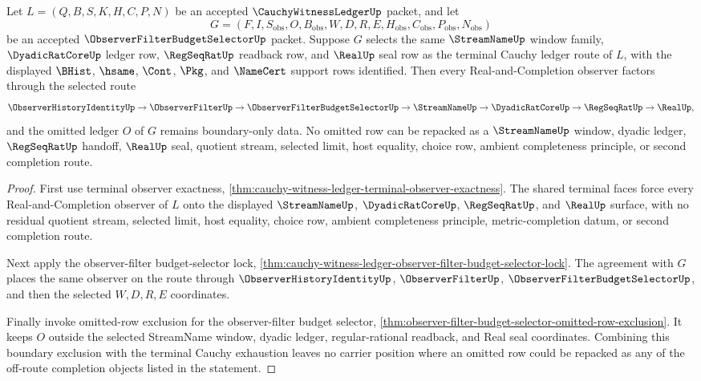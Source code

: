 \begin{theorem}
\label{thm:cauchy-witness-ledger-observer-filter-omitted-row-boundary}
Let $L=(Q,B,S,K,H,C,P,N)$ be an accepted $\CauchyWitnessLedgerUp$ packet, and let
$$
G=(F,I,S_{\mathrm{obs}},O,B_{\mathrm{obs}},W,D,R,E,H_{\mathrm{obs}},C_{\mathrm{obs}},P_{\mathrm{obs}},N_{\mathrm{obs}})
$$
be an accepted $\ObserverFilterBudgetSelectorUp$ packet. Suppose $G$ selects the same $\StreamNameUp$ window family, $\DyadicRatCoreUp$ ledger row, $\RegSeqRatUp$ readback row, and $\RealUp$ seal row as the terminal Cauchy ledger route of $L$, with the displayed $\BHist$, $\hsame$, $\Cont$, $\Pkg$, and $\NameCert$ support rows identified. Then every Real-and-Completion observer factors through the selected route
$$
\ObserverHistoryIdentityUp \to
\ObserverFilterUp \to
\ObserverFilterBudgetSelectorUp \to
\StreamNameUp \to
\DyadicRatCoreUp \to
\RegSeqRatUp \to
\RealUp,
$$
and the omitted ledger $O$ of $G$ remains boundary-only data. No omitted row can be repacked as a $\StreamNameUp$ window, dyadic ledger, $\RegSeqRatUp$ handoff, $\RealUp$ seal, quotient stream, selected limit, host equality, choice row, ambient completeness principle, or second completion route.
\end{theorem}
\begin{proof}
First use terminal observer exactness, \autoref{thm:cauchy-witness-ledger-terminal-observer-exactness}. The shared terminal faces force every Real-and-Completion observer of $L$ onto the displayed $\StreamNameUp$, $\DyadicRatCoreUp$, $\RegSeqRatUp$, and $\RealUp$ surface, with no residual quotient stream, selected limit, host equality, choice row, ambient completeness principle, metric-completion datum, or second completion route.

Next apply the observer-filter budget-selector lock, \autoref{thm:cauchy-witness-ledger-observer-filter-budget-selector-lock}. The agreement with $G$ places the same observer on the route through $\ObserverHistoryIdentityUp$, $\ObserverFilterUp$, $\ObserverFilterBudgetSelectorUp$, and then the selected $W,D,R,E$ coordinates.

Finally invoke omitted-row exclusion for the observer-filter budget selector, \autoref{thm:observer-filter-budget-selector-omitted-row-exclusion}. It keeps $O$ outside the selected StreamName window, dyadic ledger, regular-rational readback, and Real seal coordinates. Combining this boundary exclusion with the terminal Cauchy exhaustion leaves no carrier position where an omitted row could be repacked as any of the off-route completion objects listed in the statement.
\end{proof}

